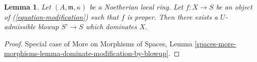 \documentclass{stacks-project}
\theoremstyle{plain}
\newtheorem{lemma}[subsection]{Lemma}
\theoremstyle{definition}
\theoremstyle{remark}
\numberwithin{equation}{subsection}
\begin{document}
\begin{lemma}
\label{lemma-dominate-by-admissible-blowup}
Let $(A, \mathfrak m, \kappa)$ be a Noetherian local ring.
Let $f : X \to S$ be an object of (\ref{equation-modification})
such that $f$ is proper.
Then there exists a $U$-admissible blowup $S' \to S$
which dominates $X$.
\end{lemma}

\begin{proof}
Special case of More on Morphisms of Spaces,
Lemma \ref{spaces-more-morphisms-lemma-dominate-modification-by-blowup}.
\end{proof}








\end{document}
